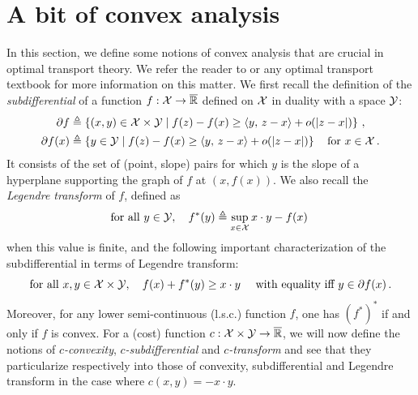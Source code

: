 \section{A bit of convex analysis}
    \label{sec:cvx-analysis}
    In this section, we define some notions of convex analysis that are crucial in optimal transport theory. We refer the reader to \cite{villani2009optimal,mccann2011five} or any optimal transport textbook for more information on this matter. We first recall the definition of the \emph{subdifferential} of a function $f:\mathcal{X}\to\overline{\mathbb{R}}$ defined on $\mathcal{X}$ in duality with a space $\mathcal{Y}$:
    \begin{align}
        \partial f&\triangleq \left\{ (x,y)\in \mathcal{X}\times\mathcal{Y}\mid f(z)-f(x)\geq \langle y,\,z-x\rangle+o(|z-x|) \right\}\,,\\
        \partial f(x)&\triangleq \left\{ y\in \mathcal{Y}\mid f(z)-f(x)\geq \langle y,\,z-x\rangle+o(|z-x|) \right\}\quad \text{for }x\in\mathcal{X}\,.
    \end{align}
    It consists of the set of (point, slope) pairs for which $y$ is the slope of a hyperplane supporting the graph of $f$ at $(x,f(x))$. We also recall the \emph{Legendre transform} of $f$, defined as
    \begin{equation}
        \text{for all }y\in\mathcal{Y},\quad f^*(y)\triangleq\sup_{x\in \mathcal{X}}x\cdot y-f(x)\,
        \label{eq:legendre}
    \end{equation}
    when this value is finite, and the following important characterization of the subdifferential in terms of Legendre transform:
    \begin{equation}
        \text{for all }x,y\in\mathcal{X}\times\mathcal{Y},\quad f(x)+f^*(y)\geq x\cdot y\quad\text{ with equality iff }y\in \partial f(x)\,.
        \label{eq:subdiff}
    \end{equation}
    Moreover, for any lower semi-continuous (l.s.c.) function $f$, one has $(f^*)^*$ if and only if $f$ is convex. For a (cost) function $c:\mathcal{X}\times\mathcal{Y}\to\overline{\mathbb{R}}$, we will now define the notions of $c$\emph{-convexity}, $c$\emph{-subdifferential} and $c$\emph{-transform} and see that they particularize respectively into those of convexity, subdifferential and Legendre transform in the case where $c(x,y)=-x\cdot y$.
